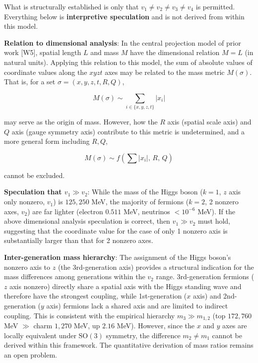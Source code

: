 \documentclass[
  a4paper,11pt]{article}
\theoremstyle{definition}
\theoremstyle{remark}
\begin{document}
What is structurally established is only that
\(v_1 \neq v_2 \neq v_3 \neq v_4\) is permitted. Everything below is
\textbf{interpretive speculation} and is not derived from within this
model.

\textbf{Relation to dimensional analysis}: In the central projection
model of prior work {[}W5{]}, spatial length \(L\) and mass \(M\) have
the dimensional relation \(M = L\) (in natural units). Applying this
relation to this model, the sum of absolute values of coordinate values
along the \(xyzt\) axes may be related to the mass metric \(M(\sigma)\).
That is, for a set \(\sigma = (x, y, z, t, R, Q)\),

\[M(\sigma) \sim \sum_{i \in \{x, y, z, t\}} |x_i|\]

may serve as the origin of mass. However, how the \(R\) axis (spatial
scale axis) and \(Q\) axis (gauge symmetry axis) contribute to this
metric is undetermined, and a more general form including \(R, Q\),

\[M(\sigma) \sim f\!\left(\sum |x_i|,\, R,\, Q\right)\]

cannot be excluded.

\textbf{Speculation that \(v_1 \gg v_2\)}: While the mass of the Higgs
boson (\(k = 1\), \(z\) axis only nonzero, \(v_1\)) is \(125{,}250\)
MeV, the majority of fermions (\(k = 2\), 2 nonzero axes, \(v_2\)) are
far lighter (electron \(0.511\) MeV, neutrinos \(< 10^{-6}\) MeV). If
the above dimensional analysis speculation is correct, then
\(v_1 \gg v_2\) must hold, suggesting that the coordinate value for the
case of only 1 nonzero axis is substantially larger than that for 2
nonzero axes.

\textbf{Inter-generation mass hierarchy}: The assignment of the Higgs
boson's nonzero axis to \(z\) (the 3rd-generation axis) provides a
structural indication for the mass differences among generations within
the \(v_2\) range. 3rd-generation fermions (\(z\) axis nonzero) directly
share a spatial axis with the Higgs standing wave and therefore have the
strongest coupling, while 1st-generation (\(x\) axis) and 2nd-generation
(\(y\) axis) fermions lack a shared axis and are limited to indirect
coupling. This is consistent with the empirical hierarchy
\(m_3 \gg m_{1,2}\) (top \(172{,}760\) MeV \(\gg\) charm \(1{,}270\)
MeV, up \(2.16\) MeV). However, since the \(x\) and \(y\) axes are
locally equivalent under \(\mathrm{SO}(3)\) symmetry, the difference
\(m_2 \neq m_1\) cannot be derived within this framework. The
quantitative derivation of mass ratios remains an open problem.
\end{document}
